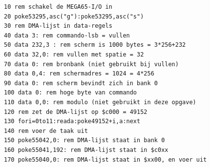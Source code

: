 \begin{tcolorbox}[colback=black,coltext=white]
\verbatimfont{\codefont}
\begin{verbatim}
10 rem schakel de MEGA65-I/O in
20 poke53295,asc("g"):poke53295,asc("s")
30 rem DMA-lijst in data-regels
40 data 3: rem commando-lsb = vullen
50 data 232,3 : rem scherm is 1000 bytes = 3*256+232
60 data 32,0: rem vullen met spatie = 32
70 data 0: rem bronbank (niet gebruikt bij vullen)
80 data 0,4: rem schermadres = 1024 = 4*256
90 data 0: rem scherm bevindt zich in bank 0
100 data 0: rem hoge byte van commando
110 data 0,0: rem modulo (niet gebruikt in deze opgave)
120 rem zet de DMA-lijst op $c000 = 49152
130 fori=0to11:reada:poke49152+i,a:next
140 rem voer de taak uit
150 poke55042,0: rem DMA-lijst staat in bank 0
160 poke55041,192: rem DMA-lijst staat in $c0xx
170 poke55040,0: rem DMA-lijst staat in $xx00, en voer uit
\end{verbatim}
\end{tcolorbox}
